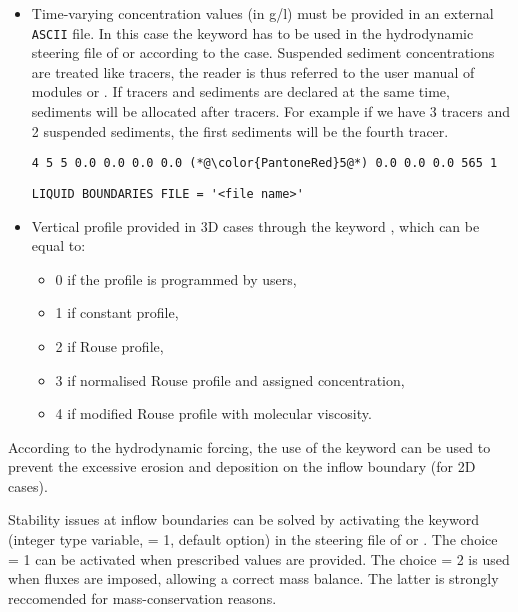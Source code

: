 \begin{itemize}
\begin{lstlisting}[frame=trBL]
4 5 5 0.0 0.0 0.0 0.0 (*@\color{PantoneRed}5@*) 0.0 0.0 0.0 565 1
\end{lstlisting}
\begin{lstlisting}[frame=trBL]
EQUILIBRIUM INFLOW CONCENTRATION = YES
SUSPENSION TRANSPORT FORMULA FOR ALL SANDS = 1
\end{lstlisting}
\item Time-varying concentration values (in g/l) must be provided in an external \texttt{ASCII} file. In this case the keyword  has to be used in the hydrodynamic steering file of  or  according to the case. Suspended sediment concentrations are treated like tracers, the reader is thus referred to the user manual of modules  or .
If tracers and sediments are declared at the same time, sediments will be allocated after tracers. For example if we have 3 tracers and 2 suspended sediments, the first sediments will be the fourth tracer.
\begin{lstlisting}[frame=trBL]
4 5 5 0.0 0.0 0.0 0.0 (*@\color{PantoneRed}5@*) 0.0 0.0 0.0 565 1
\end{lstlisting}
\begin{lstlisting}[frame=trBL]
LIQUID BOUNDARIES FILE = '<file name>'
\end{lstlisting}
\item Vertical profile provided in 3D cases through the keyword , which can be equal to:
\begin{itemize}
\item 0 if the profile is programmed by users,
\item 1 if constant profile,
\item 2 if Rouse profile,
\item 3 if normalised Rouse profile and assigned concentration,
\item 4 if modified Rouse profile with molecular viscosity.
\end{itemize}
\end{itemize}

According to the hydrodynamic forcing, the use of the keyword  can be used to prevent the excessive erosion and deposition on the inflow boundary (for 2D cases).

Stability issues at inflow boundaries can be solved by activating the keyword  (integer type variable, {\ttfamily = 1}, default option) in the steering file of  or . The choice {\ttfamily = 1} can be activated when prescribed values are provided. The choice {\ttfamily = 2} is used when fluxes are imposed, allowing a correct mass balance.
The latter is strongly reccomended for mass-conservation reasons.

